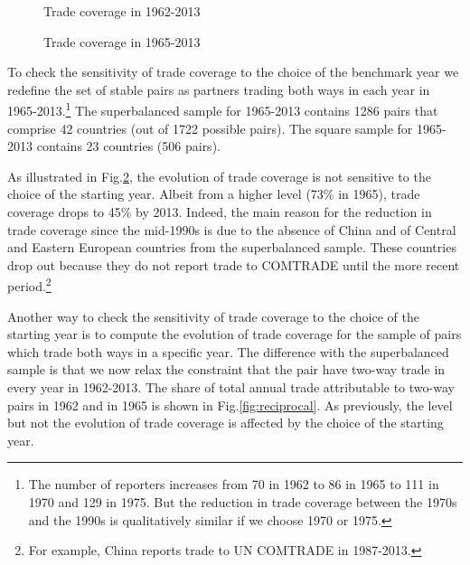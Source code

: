 \documentclass[12pt,twoside,a4paper,notitlepage]{article}
\begin{document}
{%
\begin{figure}[h]
\begin{center}
\setlength{\fboxrule}{1pt} %
\setlength{\fboxsep}{.1in} %
\end{center}
\caption{Trade coverage in 1962-2013 \label{fig:coverage}}
\end{figure}
\begin{figure}[h!]
\begin{center}
\setlength{\fboxrule}{1pt} %
\setlength{\fboxsep}{.1in} %
\end{center}
\caption{Trade coverage in 1965-2013 \label{fig:superbal6513}}
\end{figure}

To check the sensitivity of trade coverage to the choice of the benchmark year we redefine the set of stable pairs as partners trading both ways in each year in 1965-2013.\footnote{The number of reporters increases from 70 in 1962 to 86 in 1965 to 111 in 1970 and 129 in 1975. But the reduction in trade coverage between the 1970s and the 1990s is qualitatively similar if we choose 1970 or 1975.} The superbalanced sample for 1965-2013 contains 1286 pairs that comprise 42 countries (out of 1722 possible pairs). The square sample for 1965-2013 contains 23 countries (506 pairs).

As illustrated in Fig.\ref{fig:superbal6513}, the evolution of trade coverage is not sensitive to the choice of the starting year. Albeit from a higher level (73\% in 1965), trade coverage drops to 45\% by 2013. Indeed, the main reason for the reduction in trade coverage since the mid-1990s is due to the absence of China and of Central and Eastern European countries from the superbalanced sample. These countries drop out because they do not report trade to COMTRADE until the more recent period.\footnote{For example, China reports trade to UN COMTRADE in 1987-2013.} 

Another way to check the sensitivity of trade coverage to the choice of the starting year is to compute the evolution of trade coverage for the sample of pairs which trade both ways in a specific year. The difference with the superbalanced sample is that we now relax the constraint that the pair have two-way trade in every year in 1962-2013. The share of total annual trade attributable to two-way pairs in 1962 and in 1965 is shown in Fig.\ref{fig:reciprocal}. As previously, the level but not the evolution of trade coverage is affected by the choice of the starting year.

}
\end{document}
